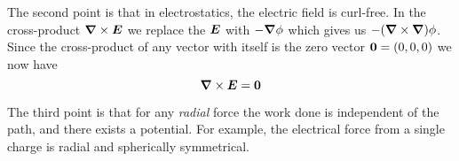 The second point is that in electrostatics, the electric field is curl-free.
In the cross-product $\boldsymbol{\nabla} \times \boldsymbol{E}$ we replace the $\boldsymbol{E}$ with $-\boldsymbol{\nabla}\phi$
which gives us $-(\boldsymbol{\nabla}\times\boldsymbol{\nabla})\phi$.
Since the cross-product of any vector with itself is the zero vector $\boldsymbol{0}=(0,0,0)$
we now have
\begin{equation}
  \boldsymbol{\nabla} \times \boldsymbol{E} = \boldsymbol{0}
\end{equation}

The third point is that for any \emph{radial} force
the work done is independent of the path, and there exists a potential.
For example, the electrical force from a single charge is 
radial and spherically symmetrical.


